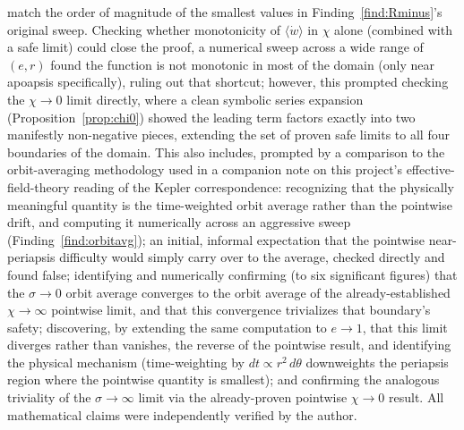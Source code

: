 \documentclass[12pt]{amsart}
\theoremstyle{plain}
\theoremstyle{remark}
\begin{document}
match the order of magnitude of the smallest values in Finding~\ref{find:Rminus}'s original sweep. Checking whether monotonicity of $\langle\dot w\rangle$ in $\chi$ alone (combined with a safe limit) could close the proof, a numerical sweep across a wide range of $(e,r)$ found the function is not monotonic in most of the domain (only near apoapsis specifically), ruling out that shortcut; however, this prompted checking the $\chi\to0$ limit directly, where a clean symbolic series expansion (Proposition~\ref{prop:chi0}) showed the leading term factors exactly into two manifestly non-negative pieces, extending the set of proven safe limits to all four boundaries of the domain. This also includes, prompted by a comparison to the orbit-averaging methodology used in a companion note on this project's effective-field-theory reading of the Kepler correspondence: recognizing that the physically meaningful quantity is the time-weighted orbit average rather than the pointwise drift, and computing it numerically across an aggressive sweep (Finding~\ref{find:orbitavg}); an initial, informal expectation that the pointwise near-periapsis difficulty would simply carry over to the average, checked directly and found false; identifying and numerically confirming (to six significant figures) that the $\sigma\to0$ orbit average converges to the orbit average of the already-established $\chi\to\infty$ pointwise limit, and that this convergence trivializes that boundary's safety; discovering, by extending the same computation to $e\to1$, that this limit diverges rather than vanishes, the reverse of the pointwise result, and identifying the physical mechanism (time-weighting by $dt\propto r^2\,d\theta$ downweights the periapsis region where the pointwise quantity is smallest); and confirming the analogous triviality of the $\sigma\to\infty$ limit via the already-proven pointwise $\chi\to0$ result. All mathematical claims were independently verified by the author.
\end{document}
